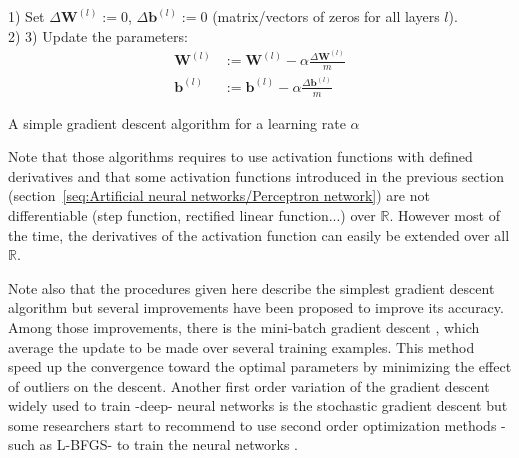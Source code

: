 \documentclass[a4paper,11pt]{report}
\begin{document}
		\begin{center}
			\begin{algorithm}[H]
				1) Set $\Delta \mathbf{W}^{(l)} := 0$, $\Delta \mathbf{b}^{(l)} := 0$ (matrix/vectors of zeros for all layers $l$).\\
				2) 
				3) Update the parameters:
					\begin{subequations}
						\label{eq:gradient descent updates}
						\begin{align}
							\mathbf{W}^{(l)} &:= \mathbf{W}^{(l)} - \alpha \frac{\Delta \mathbf{W}^{(l)}}{m}\\
							\mathbf{b}^{(l)} &:= \mathbf{b}^{(l)} - \alpha \frac{\Delta \mathbf{b}^{(l)}}{m}
						\end{align}
					\end{subequations}
				\caption[A simple gradient descent algorithm]{A simple gradient descent algorithm for a learning rate $\alpha$}
				\label{algo:Gradient descent algorithm}		
			\end{algorithm}        
		\end{center}
    
		Note that those algorithms requires to use activation functions with defined derivatives and that some activation functions introduced in the previous section (section~\ref{seq:Artificial neural networks/Perceptron network}) are not differentiable (step function, rectified linear function...) over $\mathbb{R}$. However most of the time, the derivatives of the activation function can easily be extended over all $\mathbb{R}$.\\\par
   
		Note also that the procedures given here describe the simplest gradient descent algorithm but several improvements have been proposed to improve its accuracy. Among those improvements, there is the mini-batch gradient descent \cite{Ng_course}, which average the update to be made over several training examples. This method speed up the convergence toward the optimal parameters by minimizing the effect of outliers on the descent. Another first order variation of the gradient descent widely used to train -deep- neural networks is the stochastic gradient descent but some researchers start to recommend to use second order optimization methods -such as L-BFGS- to train the neural networks \cite{Ng_course, Bengio_2009}.\\\par
		
\end{document}
